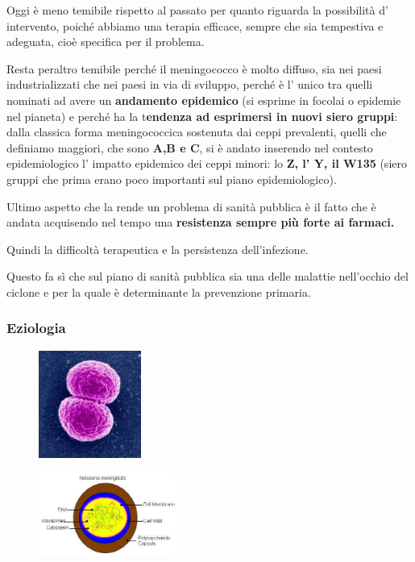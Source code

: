  Oggi è meno temibile rispetto al passato per quanto riguarda la
  possibilità d' intervento, poiché abbiamo una terapia efficace, sempre
  che sia tempestiva e adeguata, cioè specifica per il problema.

  Resta peraltro temibile perché il meningococco è molto diffuso, sia
  nei paesi industrializzati che nei paesi in via di sviluppo, perché è
  l' unico tra quelli nominati ad avere un \textbf{andamento epidemico}
  (si esprime in focolai o epidemie nel pianeta) e perché ha la
  t\textbf{endenza ad esprimersi in nuovi siero gruppi}: dalla classica
  forma meningococcica sostenuta dai ceppi prevalenti, quelli che
  definiamo maggiori, che sono \textbf{A,B e C}, si è andato inserendo
  nel contesto epidemiologico l' impatto epidemico dei ceppi minori: lo
  \textbf{Z, l' Y, il W135} (siero gruppi che prima erano poco
  importanti sul piano epidemiologico).

  Ultimo aspetto che la rende un problema di sanità pubblica è il fatto
  che è andata acquisendo nel tempo una \textbf{resistenza sempre più
  forte ai farmaci.}

  Quindi la difficoltà terapeutica e la persistenza dell'infezione.

  Questo fa sì che sul piano di sanità pubblica sia una delle malattie
  nell'occhio del ciclone e per la quale è determinante la prevenzione
  primaria.

\subsubsection{Eziologia}

\begin{figure}[!ht]
\centering
	\includegraphics[width=0.3\textwidth]{08/image1.jpg}
	\end{figure}
	
	\begin{figure}[!ht]
\centering
	\includegraphics[width=0.4\textwidth]{08/image2.jpg}
	\end{figure}

